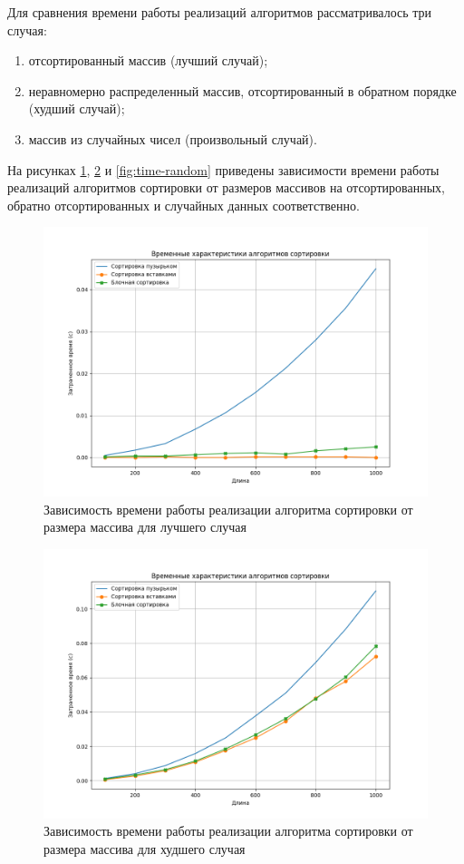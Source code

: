 Для сравнения времени работы реализаций алгоритмов рассматривалось три случая:
\begin{enumerate} 
  \item отсортированный массив (лучший случай);
  \item неравномерно распределенный массив, отсортированный в обратном порядке (худший случай);
  \item массив из случайных чисел (произвольный случай).
\end{enumerate}

На рисунках \ref{fig:time-best}, \ref{fig:time-worst} и \ref{fig:time-random} приведены зависимости времени работы реализаций алгоритмов сортировки от размеров массивов на отсортированных, обратно отсортированных и случайных данных соответственно.

\begin{figure}[h!btp]
	\centering
	\includegraphics[width=400pt]{inc/time-best.png}
	\caption{Зависимость времени работы реализации алгоритма сортировки от размера массива для лучшего случая}
	\label{fig:time-best}	
\end{figure}
\clearpage

\begin{figure}[h!btp]
	\centering
	\includegraphics[width=400pt]{inc/time-worst.png}
	\caption{Зависимость времени работы реализации алгоритма сортировки от размера массива для худшего случая}
	\label{fig:time-worst}	
\end{figure}

